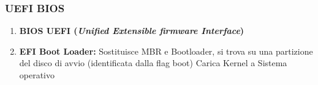 \subsubsection*{UEFI BIOS}
\begin{enumerate}
    \item \textbf{BIOS UEFI (\textit{Unified Extensible firmware Interface})}
    \item \textbf{EFI Boot Loader:}
          Sostituisce MBR e Bootloader, si trova su una partizione del disco di avvio (identificata dalla flag boot)
          Carica Kernel a Sistema operativo
\end{enumerate}
